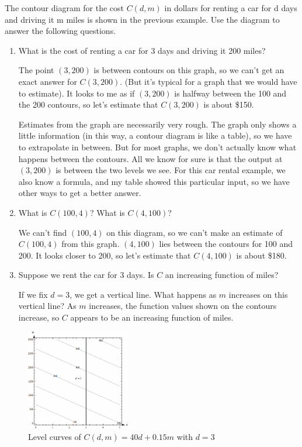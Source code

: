 \begin{example}
The contour diagram for the cost $C(d,m)$ in dollars for renting a car for d days and driving it m miles is shown in the previous example. Use the diagram to answer the following questions.
\begin{enumerate}[label=(\alph*)]
    \item What is the cost of renting a car for 3 days and driving it 200 miles?

    \begin{solution} The point $(3, 200)$ is between contours on this graph, so we can’t get an exact answer for $C(3,200)$. (But it’s typical for a graph that we would have to estimate). It looks to me as if $(3, 200)$ is halfway between the 100 and the 200 contours, so let's estimate that $C(3,200)$ is about \$150.

Estimates from the graph are necessarily very rough. The graph only shows a little information (in this way, a contour diagram is like a table), so we have to extrapolate in between. But for most graphs, we don’t actually know what happens between the contours. All we know for sure is that the output at $(3, 200)$ is between the two levels we see. For this car rental example, we also know a formula, and my table showed this particular input, so we have other ways to get a better answer.
    \end{solution}
    \item What is $C(100,4)$? What is $C(4,100)$?

    \begin{solution} We can't find $(100, 4)$ on this diagram, so we can't make an estimate of $C(100,4)$ from this graph. $(4, 100)$ lies between the contours for 100 and 200. It looks closer to 200, so let's estimate that $C(4,100)$ is about \$180.
    \end{solution}
    \item Suppose we rent the car for 3 days. Is $C$ an increasing function of miles?

    \begin{solution} If we fix $d=3$, we get a vertical line. What happens as $m$ increases on this vertical line? As $m$ increases, the function values shown on the contours increase, so $C$ appears to be an increasing function of miles.
    \end{solution}
\end{enumerate}
\begin{figure}[!ht]
  \centering
    \includegraphics[width=0.4\textwidth]{img/chap4/image024.png}
    \caption{Level curves of $C(d,m) = 40d + 0.15m$ with $d=3$}
    \label{fig:4-1-contour6}
  \end{figure}
\end{example}


